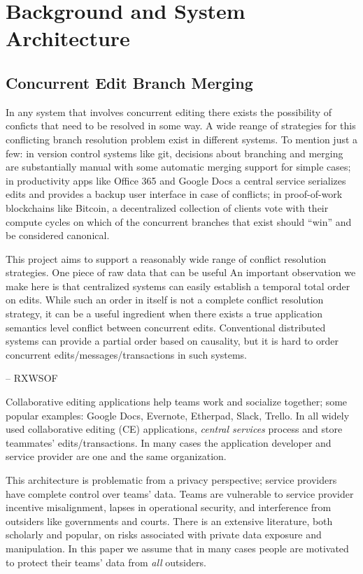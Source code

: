 \documentclass[runningheads]{llncs}
\begin{document}
\section{Background and System Architecture}

\subsection{Concurrent Edit Branch Merging}

In any system that involves concurrent editing there exists the possibility of conficts that need to be resolved in some way.
A wide reange of strategies for this conflicting branch resolution problem exist in different systems.
To mention just a few: in version control systems like git, decisions about branching and merging are substantially manual with some automatic merging support for simple cases; in productivity apps like Office 365 and Google Docs a central service serializes edits and provides a backup user interface in case of conflicts; in proof-of-work blockchains like Bitcoin, a decentralized collection of clients vote with their compute cycles on which of the concurrent branches that exist should ``win'' and be considered canonical.

This project aims to support a reasonably wide range of conflict resolution strategies.
One piece of raw data that can be useful 
An important observation we make here is that centralized systems can easily establish a temporal total order on edits.
While such an order in itself is not a complete conflict resolution strategy, it can be a useful ingredient when there exists a true application semantics level conflict between concurrent edits.
Conventional distributed systems can provide a partial order based on causality, but it is hard to order concurrent edits{\slash}messages{\slash}transactions in such systems.

--
RXWSOF

Collaborative editing applications help teams work and socialize together; some popular examples: Google Docs, Evernote, Etherpad, Slack, Trello.
In all widely used collaborative editing (CE) applications, \emph{central services} process and store teammates' edits{\slash}transactions.
In many cases the application developer and service provider are one and the same organization.

This architecture is problematic from a privacy perspective; service providers have complete control over teams' data.
Teams are vulnerable to service provider incentive misalignment, lapses in operational security, and interference from outsiders like governments and courts.
There is an extensive literature, both scholarly and popular, on risks associated with private data exposure and manipulation.
In this paper we assume that in many cases people are motivated to protect their teams' data from \emph{all} outsiders.
\end{document}
